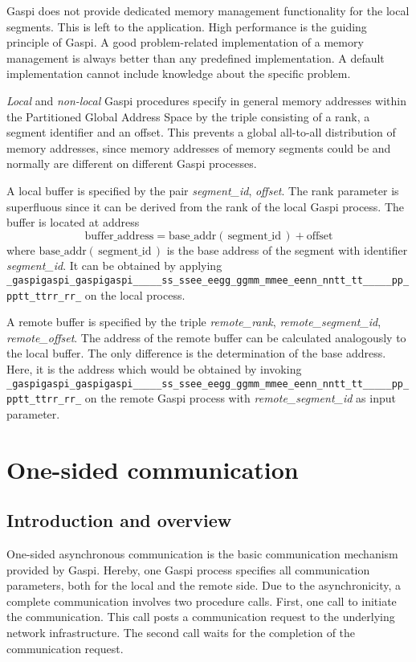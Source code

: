 \documentclass[a4paper]{article}
\makeatletter
\newlength{\lw}\setlength{\lw}{0.4pt}
\newlength{\st}\setlength{\st}{0pt}
\newcommand{\zerowsep}{\hskip 0pt plus 0.1pt minus 0.1pt}
\newcommand{\ZSEP}[1]{\ifx#1\@@@EOZ@@@\let\next\relax\else\ifx#1\_#1\zerowsep\else#1\fi\let\next\ZSEP\fi\next}
\newcommand{\zsep}[1]{\ZSEP{}#1\@@@EOZ@@@}
\newcommand{\gaspiprefix}{gaspi}
\newcommand{\GASPI}{{\sc Gaspi}}
\newcommand{\function}[1]{{\tt #1}}
\newcommand{\parameter}[1]{{\it #1}}
\newcommand{\gaspifunction}[1]{\function{\protect\zsep{\gaspiprefix\_#1}}}
\newcommand{\gaspisemantic}[1]{{\emph{#1}}}
\makeatother
\begin{document}
\GASPI{} does not provide dedicated memory management functionality
for the local segments. This is left to the application.
High performance is the guiding principle of \GASPI{}.
A good problem-related implementation of a memory management is always better
than any predefined implementation. A default implementation cannot
include knowledge about the specific problem.

\gaspisemantic{Local} and \gaspisemantic{non-local} \GASPI{} procedures
specify in general memory addresses within the Partitioned Global Address Space by
the triple consisting of a rank, a segment identifier and
an offset.  This prevents a global all-to-all distribution of memory
addresses, since memory addresses of memory segments could be and
normally are different on different \GASPI{} processes.

A local buffer is specified by the pair \parameter{segment\_id}, \parameter{offset}.
The rank parameter is superfluous since it can be derived from the rank of the local \GASPI{} process.
The buffer  is located at address
\begin{equation}
\mbox{buffer\_address} = \mbox{base\_addr}\left(\, \mbox{segment\_id} \,\right) + \mbox{offset} \nonumber
\end{equation}
where $\mbox{base\_addr}(\, \mbox{segment\_id} \,)$ is the base address of the segment with identifier
\parameter{segment\_id}.
It can be obtained by applying \gaspifunction{segment\_ptr} on the local process.

A remote buffer is specified by the triple \parameter{remote\_rank}, \parameter{remote\_segment\_id},
\parameter{remote\_offset}.
The address of the remote  buffer can be calculated analogously to the local buffer. The only
difference is the determination of the base address. Here, it is the address
which would be obtained by invoking \gaspifunction{segment\_ptr}
on the remote \GASPI{} process with \parameter{remote\_segment\_id} as input parameter.

\section{One-sided communication}

\subsection{Introduction and overview}

One-sided asynchronous communication is the basic communication
mechanism provided by \GASPI{}. Hereby, one \GASPI{} process specifies
all communication parameters, both for the local and the remote
side. Due to the asynchronicity, a complete communication
involves two procedure calls. First, one call to initiate the
communication. This call posts a communication request to the
underlying network infrastructure. The second call waits for the
completion of the communication request.
\end{document}
